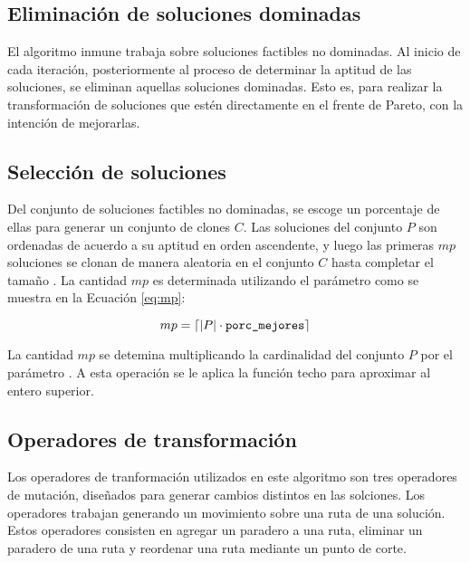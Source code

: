 \subsection{Eliminación de soluciones dominadas}

El algoritmo inmune trabaja sobre soluciones factibles no dominadas. Al inicio de cada iteración, posteriormente al proceso de determinar la aptitud de las soluciones, se eliminan aquellas soluciones dominadas. Esto es, para realizar la transformación de soluciones que estén directamente en el frente de Pareto, con la intención de mejorarlas.

\subsection{Selección de soluciones}

Del conjunto de soluciones factibles no dominadas, se escoge un porcentaje de ellas para generar un conjunto de clones $C$. Las soluciones del conjunto $P$ son ordenadas de acuerdo a su aptitud en orden ascendente, y luego las primeras $mp$ soluciones se clonan de manera aleatoria en el conjunto $C$ hasta completar el tamaño \clonsize. La cantidad $mp$ es determinada utilizando el parámetro \pmejores{} como se muestra en la Ecuación \eqref{eq:mp}:

\begin{equation}
\label{eq:mp}
mp = \ceil*{|P| \cdot \pmejores}
\end{equation}

La cantidad $mp$ se detemina multiplicando la cardinalidad del conjunto $P$ por el parámetro \pmejores. A esta operación se le aplica la función techo para aproximar al entero superior.

\subsection{Operadores de transformación}

Los operadores de tranformación utilizados en este algoritmo son tres operadores de mutación, diseñados para generar cambios distintos en las solciones. Los operadores trabajan generando un movimiento sobre una ruta de una solución. Estos operadores consisten en agregar un paradero a una ruta, eliminar un paradero de una ruta y reordenar una ruta mediante un punto de corte.

